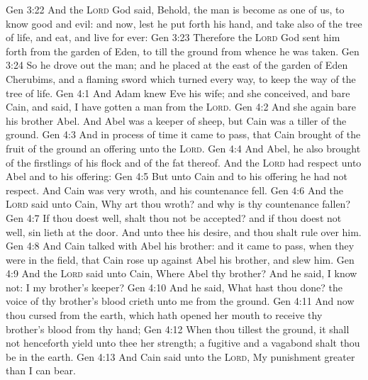 \vs Gen 3:22 And the \textsc{Lord} God said, Behold, the man is become as one of us, to know good and evil: and now, lest he put forth his hand, and take also of the tree of life, and eat, and live for ever:
\vs Gen 3:23 Therefore the \textsc{Lord} God sent him forth from the garden of Eden, to till the ground from whence he was taken.
\vs Gen 3:24 So he drove out the man; and he placed at the east of the garden of Eden Cherubims, and a flaming sword which turned every way, to keep the way of the tree of life.
\vs Gen 4:1 And Adam knew Eve his wife; and she conceived, and bare Cain, and said, I have gotten a man from the \textsc{Lord}.
\vs Gen 4:2 And she again bare his brother Abel. And Abel was a keeper of sheep, but Cain was a tiller of the ground.
\vs Gen 4:3 And in process of time it came to pass, that Cain brought of the fruit of the ground an offering unto the \textsc{Lord}.
\vs Gen 4:4 And Abel, he also brought of the firstlings of his flock and of the fat thereof. And the \textsc{Lord} had respect unto Abel and to his offering:
\vs Gen 4:5 But unto Cain and to his offering he had not respect. And Cain was very wroth, and his countenance fell.
\vs Gen 4:6 And the \textsc{Lord} said unto Cain, Why art thou wroth? and why is thy countenance fallen?
\vs Gen 4:7 If thou doest well, shalt thou not be accepted? and if thou doest not well, sin lieth at the door. And unto thee  his desire, and thou shalt rule over him.
\vs Gen 4:8 And Cain talked with Abel his brother: and it came to pass, when they were in the field, that Cain rose up against Abel his brother, and slew him.
\vs Gen 4:9 And the \textsc{Lord} said unto Cain, Where  Abel thy brother? And he said, I know not:  I my brother's keeper?
\vs Gen 4:10 And he said, What hast thou done? the voice of thy brother's blood crieth unto me from the ground.
\vs Gen 4:11 And now  thou cursed from the earth, which hath opened her mouth to receive thy brother's blood from thy hand;
\vs Gen 4:12 When thou tillest the ground, it shall not henceforth yield unto thee her strength; a fugitive and a vagabond shalt thou be in the earth.
\vs Gen 4:13 And Cain said unto the \textsc{Lord}, My punishment  greater than I can bear.
